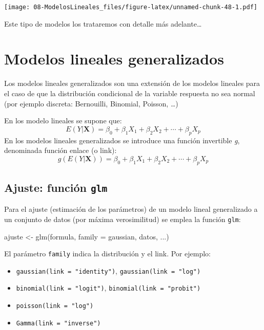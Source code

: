\documentclass[
]{book}
\newenvironment{Shaded}{\begin{snugshade}}{\end{snugshade}}
\newcommand{\AttributeTok}[1]{\textcolor[rgb]{0.77,0.63,0.00}{#1}}
\newcommand{\FunctionTok}[1]{\textcolor[rgb]{0.00,0.00,0.00}{#1}}
\newcommand{\NormalTok}[1]{#1}
\newcommand{\OtherTok}[1]{\textcolor[rgb]{0.56,0.35,0.01}{#1}}
\theoremstyle{break}
\theoremstyle{nonumberplain}
\begin{document}
\texttt{[image: 08-ModelosLineales\_files/figure-latex/unnamed-chunk-48-1.pdf]}

Este tipo de modelos los trataremos con detalle más adelante\ldots{}

\hypertarget{modelos-lineales-generalizados}{%
\chapter{Modelos lineales generalizados}\label{modelos-lineales-generalizados}}

Los modelos lineales generalizados son una extensión de los modelos lineales para el caso de que la distribución condicional de la variable respuesta no sea normal (por ejemplo discreta: Bernouilli, Binomial, Poisson, \ldots)

En los modelo lineales se supone que:
\[E( Y | \mathbf{X} ) = \beta_{0}+\beta_{1}X_{1}+\beta_{2}X_{2}+\cdots+\beta_{p}X_{p}\]
En los modelos lineales generalizados se introduce una función invertible \emph{g}, denominada función enlace (o link):
\[g\left(E(Y | \mathbf{X} )\right) = \beta_{0}+\beta_{1}X_{1}+\beta_{2}X_{2}+\cdots+\beta_{p}X_{p}\]

\hypertarget{ajuste-funciuxf3n-glm}{%
\section{\texorpdfstring{Ajuste: función \texttt{glm}}{Ajuste: función glm}}\label{ajuste-funciuxf3n-glm}}

Para el ajuste (estimación de los parámetros) de un modelo lineal generalizado a un conjunto de datos (por máxima verosimilitud) se emplea la función \texttt{glm}:

\begin{Shaded}
\begin{Highlighting}[]
\NormalTok{ajuste }\OtherTok{\textless{}{-}} \FunctionTok{glm}\NormalTok{(formula, }\AttributeTok{family =}\NormalTok{ gaussian, datos, ...)}
\end{Highlighting}
\end{Shaded}

El parámetro \texttt{family} indica la distribución y el link. Por ejemplo:

\begin{itemize}
\item
  \texttt{gaussian(link\ =\ "identity")}, \texttt{gaussian(link\ =\ "log")}
\item
  \texttt{binomial(link\ =\ "logit")}, \texttt{binomial(link\ =\ "probit")}
\item
  \texttt{poisson(link\ =\ "log")}
\item
  \texttt{Gamma(link\ =\ "inverse")}
\end{itemize}
\end{document}
